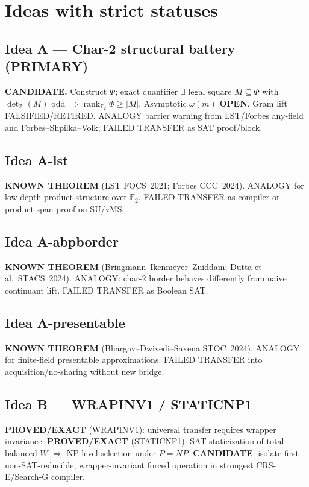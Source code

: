\documentclass[11pt]{article}
\begin{document}
\section*{Ideas with strict statuses}
\subsection*{Idea A --- Char-2 structural battery (PRIMARY)}
\textbf{CANDIDATE.} Construct $\Phi$; exact quantifier
$\exists$ legal square $M\subseteq\Phi$ with $\det_{\mathbb Z}(M)$ odd
$\Rightarrow\operatorname{rank}_{\mathbb F_2}\Phi\ge|M|$. Asymptotic $\omega(m)$
\textbf{OPEN}. Gram lift FALSIFIED/RETIRED. ANALOGY barrier warning from LST/Forbes any-field
and Forbes--Shpilka--Volk; FAILED TRANSFER as SAT proof/block.

\subsection*{Idea A-lst}
\textbf{KNOWN THEOREM} (LST FOCS~2021; Forbes CCC~2024). ANALOGY for low-depth product
structure over $\mathbb F_2$. FAILED TRANSFER as compiler or product-span proof on SU/vMS.

\subsection*{Idea A-abpborder}
\textbf{KNOWN THEOREM} (Bringmann--Ikenmeyer--Zuiddam; Dutta et al.\ STACS~2024). ANALOGY:
char-$2$ border behaves differently from naive continuant lift. FAILED TRANSFER as Boolean SAT.

\subsection*{Idea A-presentable}
\textbf{KNOWN THEOREM} (Bhargav--Dwivedi--Saxena STOC~2024). ANALOGY for finite-field
presentable approximations. FAILED TRANSFER into acquisition/no-sharing without new bridge.

\subsection*{Idea B --- WRAPINV1 / STATICNP1}
\textbf{PROVED/EXACT} (WRAPINV1): universal transfer requires wrapper invariance.
\textbf{PROVED/EXACT} (STATICNP1): SAT-staticization of total balanced $W$ $\Rightarrow$ NP-level
selection under $P=NP$. \textbf{CANDIDATE}: isolate first non-SAT-reducible, wrapper-invariant
forced operation in strongest CRS-E/Search-G compiler.
\end{document}
